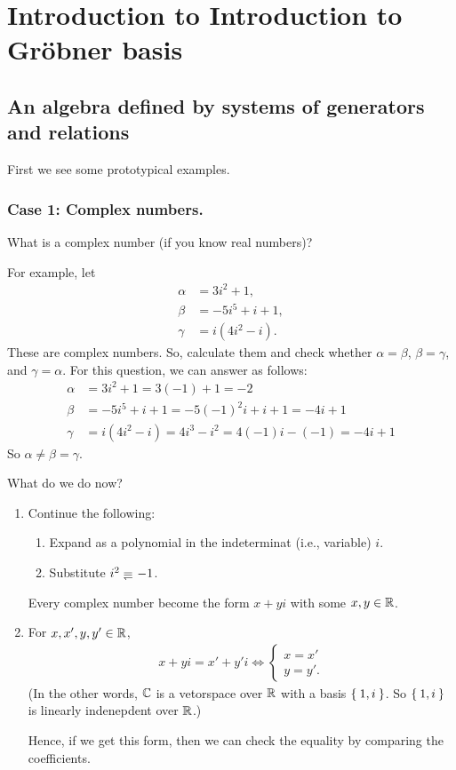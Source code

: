 \chapter{Introduction to Introduction to Gr\"obner basis}
\label{chap:intro}
\section{An algebra defined by systems of generators and relations}
First we see some prototypical examples.
\subsection{Case 1: Complex numbers.}
What is a complex number (if you know real numbers)?

For example, let
\begin{align*}
  \alpha &= 3i^2 + 1,\\
  \beta &= -5i^5 + i + 1,\\
  \gamma &= i(4i^2 - i).
\end{align*}
These are complex numbers.
So, calculate them and check whether $\alpha=\beta$, $\beta=\gamma$,
and $\gamma=\alpha$.
For this question, we can answer as follows:
\begin{align*}
  \alpha&=3i^2+1=3(-1)+1=-2\\
  \beta&=-5i^5+i+1=-5(-1)^2i+i+1=-4i+1\\
  \gamma&=i(4i^2-i)=4i^3-i^2=4(-1)i-(-1)=-4i+1
\end{align*}
So $\alpha\neq \beta=\gamma$.


What do we do now?
\begin{enumerate}
\item Continue the following:
  \begin{enumerate}
  \item Expand as a polynomial in the indeterminat (i.e., variable) $i$.
  \item Substitute $i^2\denotes -1$.
  \end{enumerate}
  Every complex number become the form $x+yi$
  with some $x,y\in\mathbb{R}$.
\item For $x,x',y,y'\in\mathbb{R}$,
  \begin{align*}
      x+yi=x'+y'i \iff \begin{cases}x=x'\\y=y'.\end{cases}
  \end{align*}
  (In the other words,
  $\mathbb{C}$ is a vetorspace over $\mathbb{R}$ with a basis $\Set{1,i}$.
  So $\Set{1,i}$ is linearly indenepdent over $\mathbb{R}$.)

  Hence, if we get this form, then we can check the equality by
  comparing the coefficients.
\end{enumerate}



